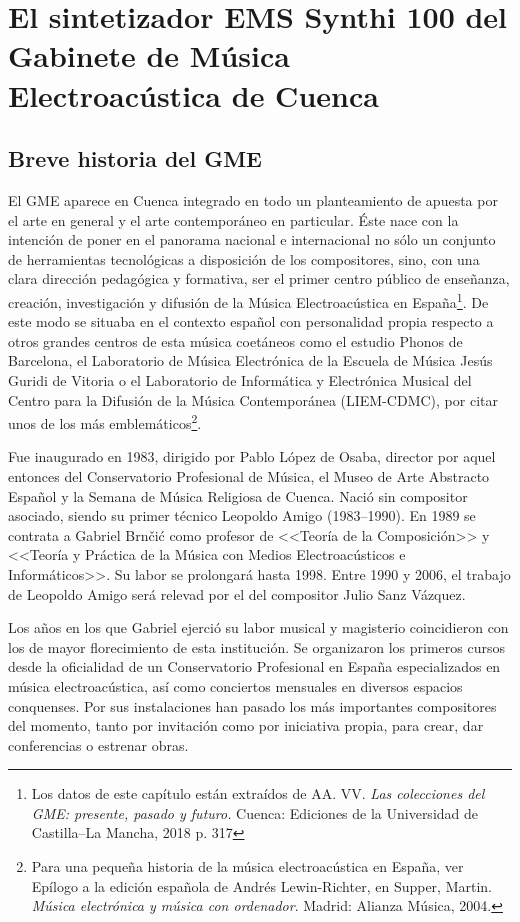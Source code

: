 \chapter[El Synthi 100 del GME de Cuenca]{El sintetizador EMS Synthi 100 del Gabinete de Música Electroacústica de Cuenca}


\section{Breve historia del GME}

El GME aparece en Cuenca integrado en todo un planteamiento de apuesta por el arte en general y el arte contemporáneo en particular. Éste nace con la intención de poner en el panorama nacional e internacional no sólo un conjunto de herramientas tecnológicas a disposición de los compositores, sino, con una clara dirección pedagógica y formativa, ser el primer centro público de enseñanza, creación, investigación y difusión de la Música Electroacústica en España\footnote{Los datos de este capítulo están extraídos de AA. VV. \textit{Las colecciones del GME: presente, pasado y futuro.} Cuenca: Ediciones de la Universidad de Castilla--La Mancha, 2018 p. 317}. De este modo se situaba en el contexto español con personalidad propia respecto a otros grandes centros de esta música coetáneos como el estudio Phonos de Barcelona, el Laboratorio de Música Electrónica de la Escuela de Música Jesús Guridi de Vitoria o el Laboratorio de Informática y Electrónica Musical del Centro para la Difusión de la Música Contemporánea (LIEM-CDMC), por citar unos de los más emblemáticos\footnote{Para una pequeña historia de la música electroacústica en España, ver Epílogo a la edición española de Andrés Lewin-Richter, en Supper, Martin.\textit{ Música electrónica y música con ordenador}. Madrid: Alianza Música, 2004.}.

Fue inaugurado en 1983, dirigido por Pablo López de Osaba, director por aquel entonces del Conservatorio Profesional de Música, el Museo de Arte Abstracto Español y la Semana de Música Religiosa de Cuenca. Nació sin compositor asociado, siendo su primer técnico Leopoldo Amigo (1983--1990). En 1989 se contrata a Gabriel Brnčić como profesor de <<Teoría de la Composición>> y <<Teoría y Práctica de la Música con Medios Electroacústicos e Informáticos>>. Su labor se prolongará hasta 1998. Entre 1990 y 2006, el trabajo de Leopoldo Amigo será relevad por el del compositor Julio Sanz Vázquez. 

Los años en los que Gabriel ejerció su labor musical y magisterio coincidieron con los de mayor florecimiento de esta institución. Se organizaron los primeros cursos desde la oficialidad de un Conservatorio Profesional en España especializados en música electroacústica, así como conciertos mensuales en diversos espacios conquenses. Por sus instalaciones han pasado los más importantes compositores del momento, tanto por invitación como por iniciativa propia, para crear, dar conferencias o estrenar obras.

